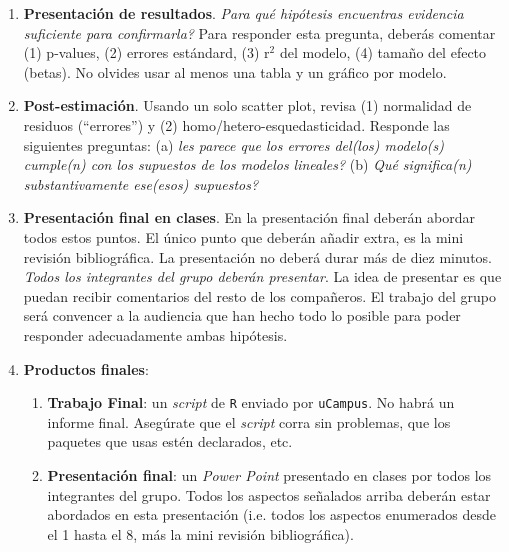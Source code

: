 \documentclass[10pt]{article}
\begin{document}
\begin{enumerate}
	\item {\bf Presentaci\'on de resultados}. \emph{Para qu\'e hip\'otesis encuentras evidencia suficiente para confirmarla?} Para responder esta pregunta, deber\'as comentar (1) p-values, (2) errores est\'andard, (3) r$^{2}$ del modelo, (4) tama\~no del efecto (betas). No olvides usar al menos una tabla y un gr\'afico por modelo.

	\item {\bf Post-estimaci\'on}. Usando un solo scatter plot, revisa (1) normalidad de residuos (``errores'') y (2) homo/hetero-esquedasticidad. Responde las siguientes preguntas: (a) \emph{les parece que los errores del(los) modelo(s) cumple(n) con los supuestos de los modelos lineales?} (b) \emph{Qu\'e significa(n) substantivamente ese(esos) supuestos?}

	\item {\bf Presentaci\'on final en clases}. En la presentaci\'on final deber\'an abordar todos estos puntos. El \'unico punto que deber\'an a\~nadir extra, es la mini revisi\'on bibliogr\'afica. La presentaci\'on no deber\'a durar m\'as de diez minutos. \emph{Todos los integrantes del grupo deber\'an presentar}. La idea de presentar es que puedan recibir comentarios del resto de los compa\~neros. El trabajo del grupo ser\'a convencer a la audiencia que han hecho todo lo posible para poder responder adecuadamente ambas hip\'otesis.

	\item {\bf Productos finales}: 

		\begin{enumerate}
			\item {\bf Trabajo Final}: un \emph{script} de \texttt{R} enviado por \texttt{uCampus}. No habr\'a un informe final. Aseg\'urate que el \emph{script} corra sin problemas, que los paquetes que usas est\'en declarados, etc.
			\item {\bf Presentaci\'on final}: un \emph{Power Point} presentado en clases por todos los integrantes del grupo. Todos los aspectos se\~nalados arriba deber\'an estar abordados en esta presentaci\'on (i.e. todos los aspectos enumerados desde el 1 hasta el 8, m\'as la mini revisi\'on bibliogr\'afica).
		\end{enumerate}

\end{enumerate}
\end{document}
